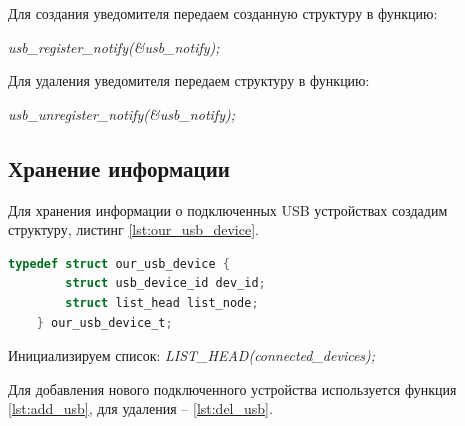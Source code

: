 \documentclass[a4paper, 10pt]{article}
\begin{document}
	Для создания уведомителя передаем созданную структуру в функцию:
	
	\hspace*{5mm}\textit{usb\_register\_notify(\&usb\_notify);}
	
	Для удаления уведомителя передаем структуру в функцию:
	
	\hspace*{5mm}\textit{usb\_unregister\_notify(\&usb\_notify);}
	\subsection{Хранение информации}
	\hspace*{5mm} Для хранения информации о подключенных USB устройствах создадим структуру, листинг \ref{lst:our_usb_device}.
	
	\begin{lstlisting}[language=C, caption = Структура our\_usb\_device, label =  lst:our_usb_device]
	typedef struct our_usb_device {
		struct usb_device_id dev_id;
		struct list_head list_node;
	} our_usb_device_t;
	\end{lstlisting}
	
	Инициализируем список: \textit{LIST\_HEAD(connected\_devices);}
	
	Для добавления нового подключенного устройства используется функция \ref{lst:add_usb},  для удаления -- \ref{lst:del_usb}.
\end{document}

